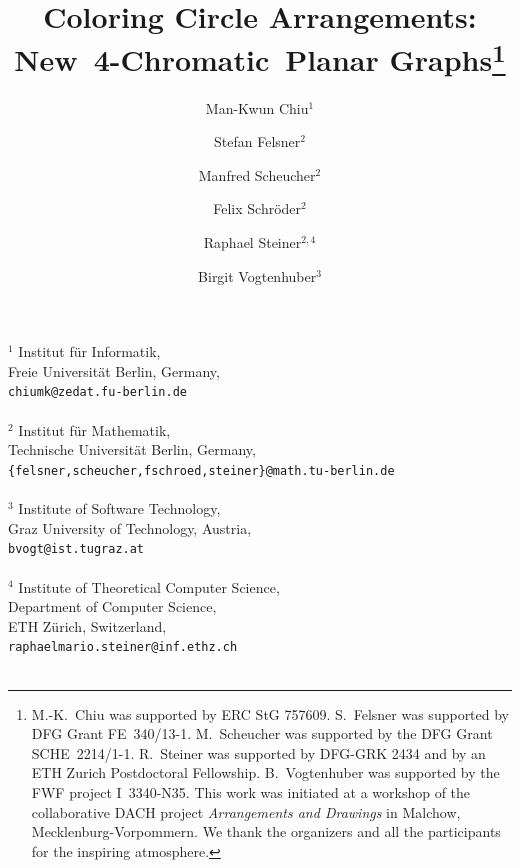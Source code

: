 \documentclass[fontsize=11pt,a4paper,DIV12]{scrartcl}
\date{}
\title{Coloring Circle Arrangements:
	New~4-Chromatic~Planar Graphs\footnote{
		M.-K.\ Chiu was supported  by ERC StG 757609.
		S.\ Felsner was supported by DFG Grant  FE~340/13-1.
		M.\ Scheucher was supported 
		by the DFG Grant SCHE~2214/1-1.
		R.\ Steiner was supported by DFG-GRK 2434 and by an ETH Zurich Postdoctoral Fellowship.
		B.\ Vogtenhuber was supported by the FWF project \mbox{I 3340-N35}.
		This work was initiated at a workshop of the collaborative DACH project
		\emph{Arrangements and  Drawings} in Malchow, Mecklenburg-Vorpommern.
		We thank the organizers and all the participants for the  inspiring atmosphere. }
}
\def\inst#1{$^{#1}$}
\begin{document}
	
\author{
	Man-Kwun Chiu\inst{1}
	\and
	Stefan Felsner\inst{2}
	\and
	Manfred Scheucher\inst{2}
	\and
	Felix Schröder\inst{2}
	\and
	Raphael Steiner\inst{2,4}
	\and
	Birgit Vogtenhuber\inst{3}
}

\maketitle
\vspace{-1.cm}
\begin{center}
	{\footnotesize
		\inst{1}
		Institut f\"ur Informatik,\\
		Freie Universit\"at Berlin, Germany,\\
		\texttt{chiumk@zedat.fu-berlin.de}
		\\\ \\
		\inst{2}
		Institut f\"ur Mathematik,\\
		Technische Universit\"at Berlin, Germany,\\
		\texttt{\{felsner,scheucher,fschroed,steiner\}@math.tu-berlin.de}
		\\\ \\
		\inst{3}
		Institute of Software Technology,\\
		Graz University of Technology, Austria,\\
		\texttt{bvogt@ist.tugraz.at}
		\\\ \\
		\inst{4} Institute of Theoretical Computer Science,\\
		Department of Computer Science,\\
		ETH Z\"{u}rich, Switzerland,\\
		\texttt{raphaelmario.steiner@inf.ethz.ch}
		\\\ \\
	}
\end{center}
\end{document}
